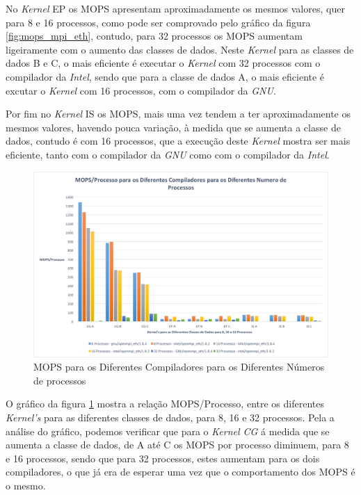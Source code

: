 \documentclass[conference,compsoc]{IEEEtran}
\begin{document}
No \textit{Kernel} EP os MOPS apresentam aproximadamente os mesmos valores, quer para 8 e 16 processos, como pode ser comprovado pelo gráfico da figura \ref{fig:mops_mpi_eth}, contudo, para 32 processos os MOPS aumentam ligeiramente com o aumento das classes de dados. Neste \textit{Kernel} para as classes de dados B e C, o mais eficiente é executar o \textit{Kernel} com 32 processos com o compilador da \textit{Intel}, sendo que para a classe de dados A, o mais eficiente é excutar o \textit{Kernel} com 16 processos, com o compilador da \textit{GNU}.

Por fim no \textit{Kernel} IS os MOPS, mais uma vez tendem a ter aproximadamente os mesmos valores, havendo pouca variação, à medida que se aumenta a classe de dados, contudo é com 16 processos, que a execução deste \textit{Kernel} mostra ser mais eficiente, tanto com o compilador da \textit{GNU} como com o compilador da \textit{Intel}.

\begin{figure}[h!]
\centering
\includegraphics[scale=0.325]{MPI/mops-process_dif_compiladores_dif_num_proc.png}
\caption{MOPS para os Diferentes Compiladores para os Diferentes Números de processos}
\label{fig:mops-process_mpi_eth}
\end{figure}

O gráfico da figura \ref{fig:mops-process_mpi_eth} mostra a relação MOPS/Processo, entre os diferentes \textit{Kernel's} para as diferentes classes de dados, para 8, 16 e 32 processos. Pela a análise do gráfico, podemos verificar que para o \textit{Kernel CG} á medida que se aumenta a classe de dados, de A até C os MOPS por processo diminuem, para 8 e 16 processos, sendo que para 32 processos, estes aumentam para os dois compiladores, o que já era de esperar uma vez que o comportamento dos MOPS é o mesmo.
\end{document}
